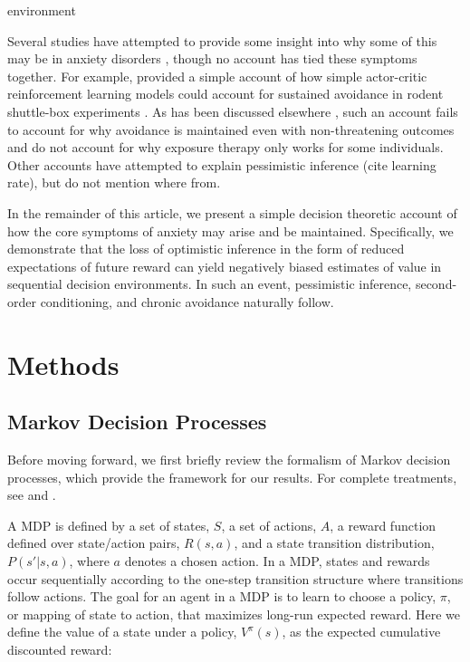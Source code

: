 environment\documentclass[11pt]{article} %
\begin{document}
Several studies have attempted to provide some insight into why some of this
may be in anxiety disorders \cite{Maia2010, norbury2018}, though no account has
tied these symptoms together. For example, \citep{Maia2010} provided a simple
account of how simple actor-critic reinforcement learning models could account
for sustained avoidance in rodent shuttle-box experiments \citep{servatius2008}.
As has been discussed elsewhere \citep{Moutoussis2017}, such an account fails to account for why avoidance
is maintained even with non-threatening outcomes and do not account for why exposure
therapy only works for some individuals. Other accounts have attempted to explain
pessimistic inference (cite learning rate), but do not mention where from.

In the remainder of this article, we present a simple decision theoretic account
of how the core symptoms of anxiety may arise and be maintained. Specifically, we
demonstrate that the loss of optimistic inference in the form of reduced expectations
of future reward can yield negatively biased estimates of value in sequential
decision environments. In such an event, pessimistic inference, second-order
conditioning, and chronic avoidance naturally follow.

\section{Methods}

\subsection{Markov Decision Processes}

Before moving forward, we first briefly review the formalism of Markov decision
processes, which provide the framework for our results. For complete treatments,
see \cite{SuttonBarto1998, SuttonBarto2018} and \cite{bertsekas2005}.

A MDP is defined by a set of states, $S$, a set of actions, $A$, a reward
function defined over state/action pairs, $R(s,a)$, and a state transition distribution,
$P(s'|s,a)$, where $a$ denotes a chosen action. In a MDP, states and rewards occur
sequentially according to the one-step transition structure where transitions follow
actions. The goal for an agent in a MDP is to learn to choose a policy, $\pi$, or
mapping of state to action, that maximizes long-run expected reward. Here we define
the value of a state under a policy, $V^\pi(s)$, as the expected cumulative discounted reward:
\end{document}
